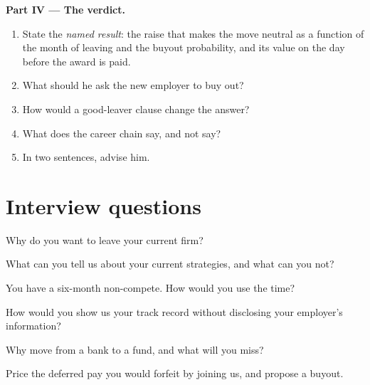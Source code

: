 \begin{problem}
\medskip\noindent\textbf{Part IV --- The verdict.}
\begin{enumerate}[resume]
\item State the \emph{named result}: the raise that makes the move neutral as a function of the month of leaving and the
buyout probability, and its value on the day before the award is paid.
\item What should he ask the new employer to buy out?
\item How would a good-leaver clause change the answer?
\item What does the career chain say, and not say?
\item In two sentences, advise him.
\end{enumerate}
\end{problem}

\section{Interview questions}

\begin{interviewq}\label{iq:in:career-paths-and-moves:1}
Why do you want to leave your current firm?
\end{interviewq}

\begin{interviewq}\label{iq:in:career-paths-and-moves:2}
What can you tell us about your current strategies, and what can you not?
\end{interviewq}

\begin{interviewq}\label{iq:in:career-paths-and-moves:3}
You have a six-month non-compete. How would you use the time?
\end{interviewq}

\begin{interviewq}\label{iq:in:career-paths-and-moves:4}
How would you show us your track record without disclosing your employer's information?
\end{interviewq}

\begin{interviewq}\label{iq:in:career-paths-and-moves:5}
Why move from a bank to a fund, and what will you miss?
\end{interviewq}

\begin{interviewq}\label{iq:in:career-paths-and-moves:6}
Price the deferred pay you would forfeit by joining us, and propose a buyout.
\end{interviewq}
